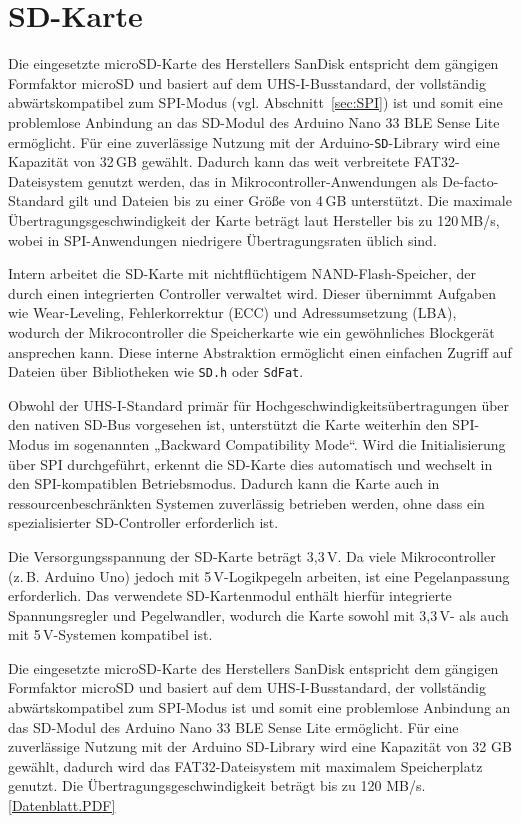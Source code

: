 \section{SD-Karte}

Die eingesetzte microSD-Karte des Herstellers \glqq SanDisk\grqq{} entspricht dem gängigen Formfaktor microSD und basiert auf dem UHS-I-Busstandard, der vollständig abwärtskompatibel zum SPI-Modus (vgl. Abschnitt~\ref{sec:SPI}) ist und somit eine problemlose Anbindung an das SD-Modul des Arduino Nano 33 BLE Sense Lite ermöglicht. Für eine zuverlässige Nutzung mit der Arduino-\texttt{SD}-Library wird eine Kapazität von 32\,GB gewählt. Dadurch kann das weit verbreitete FAT32-Dateisystem genutzt werden, das in Mikrocontroller-Anwendungen als De-facto-Standard gilt und Dateien bis zu einer Größe von 4\,GB unterstützt. Die maximale Übertragungsgeschwindigkeit der Karte beträgt laut Hersteller bis zu 120\,MB/s, wobei in SPI-Anwendungen niedrigere Übertragungsraten üblich sind. \cite{WesternDigitalTechnologies.2022}

Intern arbeitet die SD-Karte mit nichtflüchtigem NAND-Flash-Speicher, der durch einen integrierten Controller verwaltet wird. Dieser übernimmt Aufgaben wie Wear-Leveling, Fehlerkorrektur (ECC) und Adressumsetzung (LBA), wodurch der Mikrocontroller die Speicherkarte wie ein gewöhnliches Blockgerät ansprechen kann. Diese interne Abstraktion ermöglicht einen einfachen Zugriff auf Dateien über Bibliotheken wie \texttt{SD.h} oder \texttt{SdFat}. \cite{Subero.2024}

Obwohl der UHS-I-Standard primär für Hochgeschwindigkeitsübertragungen über den nativen SD-Bus vorgesehen ist, unterstützt die Karte weiterhin den SPI-Modus im sogenannten „Backward Compatibility Mode“. Wird die Initialisierung über SPI durchgeführt, erkennt die SD-Karte dies automatisch und wechselt in den SPI-kompatiblen Betriebsmodus. Dadurch kann die Karte auch in ressourcenbeschränkten Systemen zuverlässig betrieben werden, ohne dass ein spezialisierter SD-Controller erforderlich ist.

Die Versorgungsspannung der SD-Karte beträgt 3{,}3\,V. Da viele Mikrocontroller (z.\,B. Arduino Uno) jedoch mit 5\,V-Logikpegeln arbeiten, ist eine Pegelanpassung erforderlich. Das verwendete SD-Kartenmodul enthält hierfür integrierte Spannungsregler und Pegelwandler, wodurch die Karte sowohl mit 3{,}3\,V- als auch mit 5\,V-Systemen kompatibel ist.


Die eingesetzte microSD-Karte des Herstellers \glqq SanDisk\grqq{} entspricht dem gängigen Formfaktor microSD und basiert auf dem UHS-I-Busstandard, der vollständig abwärtskompatibel zum SPI-Modus ist und somit eine problemlose Anbindung an das SD-Modul des Arduino Nano 33 BLE Sense Lite ermöglicht. Für eine zuverlässige Nutzung mit der Arduino SD-Library wird eine Kapazität von 32 GB gewählt, dadurch wird das FAT32-Dateisystem mit maximalem Speicherplatz genutzt. Die Übertragungsgeschwindigkeit beträgt bis zu 120 MB/s.
\cite{WesternDigitalTechnologies.2022} 
\href{../../../Documents/Datenblaetter/Datenbatt SD-Karte}{[Datenblatt.PDF]}


